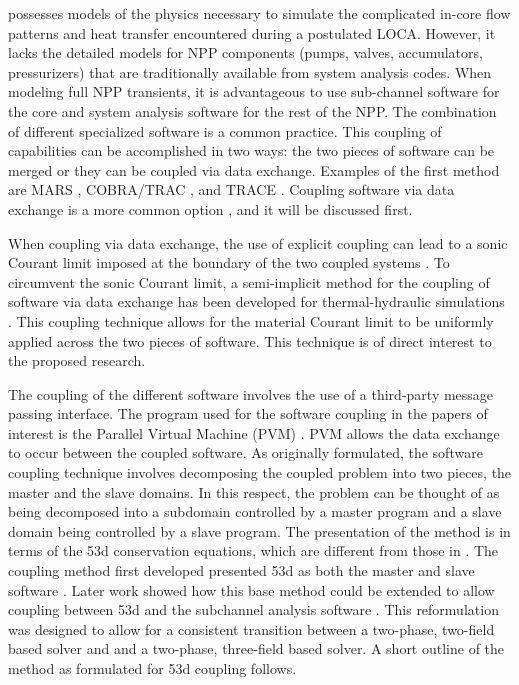 \cobra{} possesses models of the physics necessary to simulate the complicated in-core flow patterns and heat transfer encountered during a postulated LOCA.
However, it lacks the detailed models for NPP components (pumps, valves, accumulators, pressurizers) that are traditionally available from system analysis codes.
When modeling full NPP transients, it is advantageous to use sub-channel software for the core and system analysis software for the rest of the NPP.
The combination of different specialized software is a common practice.
This coupling of capabilities can be accomplished in two ways: the two pieces of software can be merged or they can be coupled via data exchange.
Examples of the first method are MARS \cite{Jeong2008}, COBRA/TRAC \cite{Thurgood1983c}, and TRACE \cite{TRACE}.
Coupling software via data exchange is a more common option \cite{Makihara2003, Aumiller2002, Aumiller2001, Avramova2006, Weaver2002, Rodriguez2002}, and it will be discussed first.

When coupling via data exchange, the use of explicit coupling can lead to a sonic Courant limit imposed at the boundary of the two coupled systems \cite{Ragusa2009, Aumiller2001}.
To circumvent the sonic Courant limit, a semi-implicit method for the coupling of software via data exchange has been developed for thermal-hydraulic simulations \cite{Weaver2002, Aumiller2002}.
This coupling technique allows for the material Courant limit to be uniformly applied across the two pieces of software.
This technique is of direct interest to the proposed research.

The coupling of the different software involves the use of a third-party message passing interface.
The program used for the software coupling in the papers of interest is the Parallel Virtual Machine (PVM) \cite{Geist1994}.
PVM allows the data exchange to occur between the coupled software.
As originally formulated, the software coupling technique involves decomposing the coupled problem into two pieces, the master and the slave domains.
In this respect, the problem can be thought of as being decomposed into a subdomain controlled by a master program and a slave domain being controlled by a slave program.
The presentation of the method is in terms of the \relap53d{} conservation equations, which are different from those in \cobra{}.
The coupling method first developed presented \relap53d{} as both the master and slave software \cite{Weaver2002}.
Later work showed how this base method could be extended to allow coupling between \relap53d{} and the \cobra{} subchannel analysis software \cite{Aumiller2002}.
This reformulation was designed to allow for a consistent transition between a two-phase, two-field based solver and and a two-phase, three-field based solver. 
A short outline of the method as formulated for \relap53d{} coupling follows.

